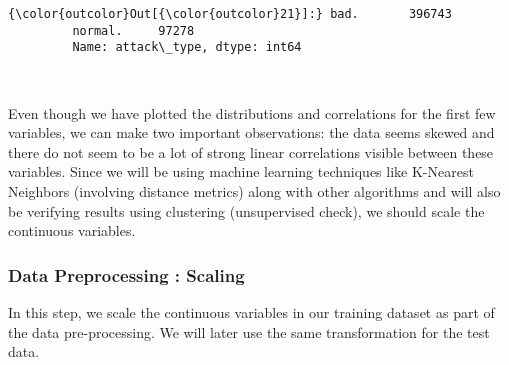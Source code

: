 \documentclass[11pt]{article}
\begin{document}
\begin{Verbatim}[commandchars=\\\{\}]
{\color{outcolor}Out[{\color{outcolor}21}]:} bad.       396743
         normal.     97278
         Name: attack\_type, dtype: int64
\end{Verbatim}
            
    \begin{center}
    \end{center}
    { \hspace*{\fill} \\}
    
    Even though we have plotted the distributions and correlations for the
first few variables, we can make two important observations: the data
seems skewed and there do not seem to be a lot of strong linear
correlations visible between these variables. Since we will be using
machine learning techniques like K-Nearest Neighbors (involving distance
metrics) along with other algorithms and will also be verifying results
using clustering (unsupervised check), we should scale the continuous
variables.

    \subsubsection{Data Preprocessing :
Scaling}\label{data-preprocessing-scaling}

In this step, we scale the continuous variables in our training dataset
as part of the data pre-processing. We will later use the same
transformation for the test data.
\end{document}
